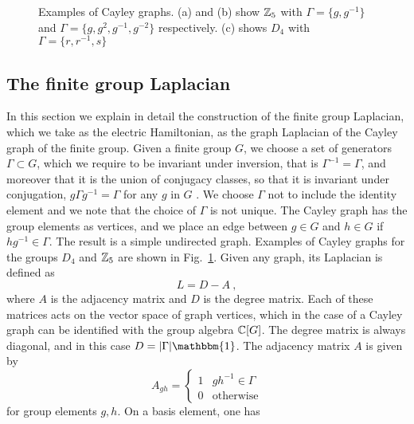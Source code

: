 \begin{figure}[t]
    \centering
    
    \caption[Examples of Cayley graphs]{%
        Examples of Cayley graphs.
        (a) and (b) show $\mathbb{Z}_5$ with $\Gamma = \{g,g^{-1}\}$ and $\Gamma = \{g,g^2, g^{-1}, g^{-2}\}$ respectively.
        (c) shows $D_4$ with $\Gamma = \{r,r^{-1}, s\}$
    }
    \label{fig:examples of Cayley graphs}
\end{figure}



\subsection{The finite group Laplacian}
\label{sub:finite_group_laplacian}
In this section we explain in detail the construction of the finite group Laplacian, which we take as the electric Hamiltonian, as the graph Laplacian of the Cayley graph of the finite group.
Given a finite group $G$, we choose a set of generators $\Gamma \subset G$, which we require to be invariant under inversion, that is $\Gamma^{-1}=\Gamma$, and moreover that it is the union of conjugacy classes, so that it is invariant under conjugation, $g \Gamma g^{-1}=\Gamma$ for any $g$ in $G$ \cite{spectralgraphtheory}.
We choose $\Gamma$ not to include the identity element and we note that the choice of $\Gamma$ is not unique.
The Cayley graph has the group elements as vertices, and we place an edge between $g \in G$ and $h \in G$ if $h g^{-1} \in \Gamma$.
The result is a simple undirected graph.
Examples of Cayley graphs for the groups $D_4$ and $\mathbb{Z}_5$ are shown in Fig.~\ref{fig:examples of Cayley graphs}.
Given any graph, its Laplacian is defined as \cite{spectralgraphtheory}
\begin{equation}
    L = D-A \ ,
\end{equation}
where $A$ is the adjacency matrix and $D$ is the degree matrix.
Each of these matrices acts on the vector space of graph vertices, which in the case of a Cayley graph can be identified with the group algebra $\mathbb{C}[G]$.
The degree matrix is always diagonal, and in this case $D=\abs{\Gamma} \mathbbm{1}$.
The adjacency matrix $A$ is given by
\begin{equation}
    A_{gh} = \begin{cases}1 & g h^{-1} \in \Gamma\\ 0 & \mathrm{otherwise}\end{cases}
\end{equation}
for group elements $g,h$.
On a basis element, one has
